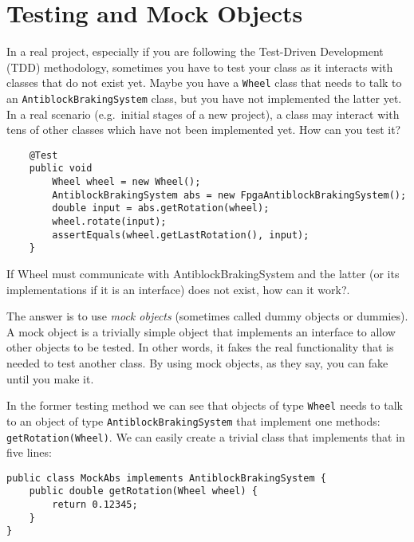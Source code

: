 
\section{Testing and Mock Objects}
\label{sec:testing-mock-objects}

In a real project, especially if you are following the Test-Driven
Development (TDD) methodology, sometimes you have to test your class
as it interacts with classes that do not exist yet. Maybe you have a
\verb+Wheel+ class that needs to talk to 
an \verb+AntiblockBrakingSystem+ class, but
you have not implemented the latter yet. In a real scenario
(e.g.~initial stages of a new project), a class may interact with tens
of other classes which have not been implemented yet. How can you test
it?


\begin{verbatim}
    @Test
    public void 
        Wheel wheel = new Wheel();
        AntiblockBrakingSystem abs = new FpgaAntiblockBrakingSystem();
        double input = abs.getRotation(wheel);
        wheel.rotate(input);
        assertEquals(wheel.getLastRotation(), input);
    }
\end{verbatim}

If Wheel must communicate with AntiblockBrakingSystem and the latter
(or its implementations if it is an interface) does not exist, how can
it work?.

The answer is to use \emph{mock objects} (sometimes called dummy
objects or dummies). A mock object is a trivially simple object that
implements an interface to allow other objects to be tested. In other
words, it fakes the real functionality that is needed to test another
class. By using mock objects, as they say, you can fake until you make
it. 

In the former testing method we can see that
objects of type \verb+Wheel+ needs to talk to an object of type
\verb+AntiblockBrakingSystem+ that implement one methods:
\verb+getRotation(Wheel)+. 
We can
easily create a trivial class that implements that in five lines: 

\begin{verbatim}
public class MockAbs implements AntiblockBrakingSystem {
    public double getRotation(Wheel wheel) {
        return 0.12345;
    }
}
\end{verbatim}

